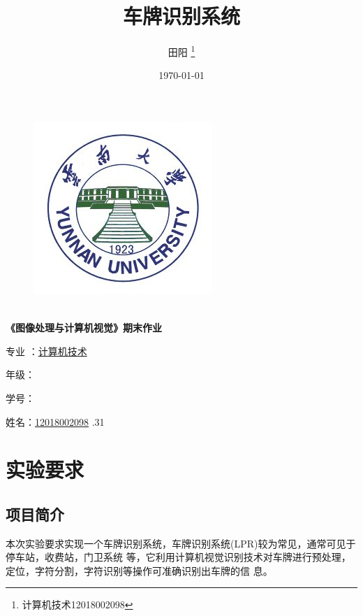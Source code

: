 \documentclass[UTF8,10pt,titlepage,a4paper]{ctexart}
\title{车牌识别系统}
\author{田阳 \thanks{计算机技术12018002098}}
\date{\today}
\begin{document}
\thispagestyle{empty}
\begin{figure}[t]
\vskip 2cm
\begin{center}
\includegraphics[scale=0.6]{ynu.jpg} \\
\end{center}
\end{figure}
\begin{center}
   \quad \\
  {\kaishu {} \textbf{《图像处理与计算机视觉》期末作业}}
\end{center}
\vskip 2.5cm
\begin{flushleft}
    \songti {}
		\par\setlength\parindent{8em}
    \quad 
    
    专\hspace{0.61cm}业 ：\underline{计算机技术\quad}

    年\hspace{0.61cm}级：\underline{\qquad}

    学\hspace{0.61cm}号：\underline{\qquad}

  	姓\hspace{0.61cm}名：\underline{12018002098\quad}
    \vskip 3cm
    .31
\end{flushleft}


\newpage
\thispagestyle{empty}
\tableofcontents
\newpage
\setcounter{page}{1}
\section{实验要求}
\subsection{项目简介}
本次实验要求实现一个车牌识别系统，车牌识别系统(LPR)较为常见，通常可见于停车站，收费站，门卫系统
等，它利用计算机视觉识别技术对车牌进行预处理，定位，字符分割，字符识别等操作可准确识别出车牌的信
息。
\end{document}
